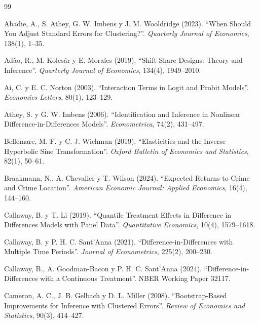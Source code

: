 \documentclass[11pt,a4paper]{article}
\begin{document}
\begin{thebibliography}{99}
\small

Abadie, A., S. Athey, G. W. Imbens y J. M. Wooldridge (2023). ``When Should You Adjust Standard Errors for Clustering?''. \emph{Quarterly Journal of Economics}, 138(1), 1--35.

Adão, R., M. Kolesár y E. Morales (2019). ``Shift-Share Designs: Theory and Inference''. \emph{Quarterly Journal of Economics}, 134(4), 1949--2010.

Ai, C. y E. C. Norton (2003). ``Interaction Terms in Logit and Probit Models''. \emph{Economics Letters}, 80(1), 123--129.

Athey, S. y G. W. Imbens (2006). ``Identification and Inference in Nonlinear Difference-in-Differences Models''. \emph{Econometrica}, 74(2), 431--497.

Bellemare, M. F. y C. J. Wichman (2019). ``Elasticities and the Inverse Hyperbolic Sine Transformation''. \emph{Oxford Bulletin of Economics and Statistics}, 82(1), 50--61.

Braakmann, N., A. Chevalier y T. Wilson (2024). ``Expected Returns to Crime and Crime Location''. \emph{American Economic Journal: Applied Economics}, 16(4), 144--160.

Callaway, B. y T. Li (2019). ``Quantile Treatment Effects in Difference in Differences Models with Panel Data''. \emph{Quantitative Economics}, 10(4), 1579--1618.

Callaway, B. y P. H. C. Sant'Anna (2021). ``Difference-in-Differences with Multiple Time Periods''. \emph{Journal of Econometrics}, 225(2), 200--230.

Callaway, B., A. Goodman-Bacon y P. H. C. Sant'Anna (2024). ``Difference-in-Differences with a Continuous Treatment''. NBER Working Paper 32117.

Cameron, A. C., J. B. Gelbach y D. L. Miller (2008). ``Bootstrap-Based Improvements for Inference with Clustered Errors''. \emph{Review of Economics and Statistics}, 90(3), 414--427.


\end{thebibliography}
\end{document}
